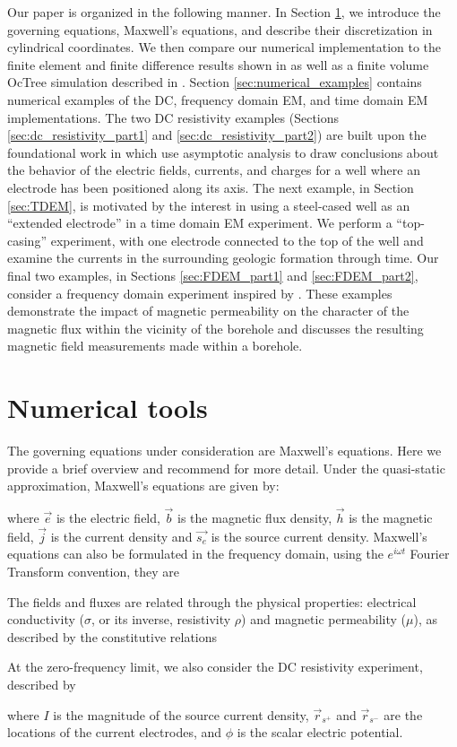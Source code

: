 \documentclass[preprint,review,3p,times,onecolumn,authoryear]{elsarticle}
\begin{document}
Our paper is organized in the following manner. In Section \ref{sec:numerical_tools}, we introduce the governing equations, Maxwell's equations, and describe their discretization in cylindrical coordinates. We then compare our numerical implementation to the finite element and finite difference results shown in \citep{Commer2015} as well as a finite volume OcTree simulation described in \citep{Haber2007}. Section \ref{sec:numerical_examples} contains numerical examples of the DC, frequency domain EM, and time domain EM implementations. The two DC resistivity examples (Sections \ref{sec:dc_resistivity_part1} and \ref{sec:dc_resistivity_part2}) are built upon the foundational work in \citep{Kaufman1990, Kaufman1993} which use asymptotic analysis to draw conclusions about the behavior of the electric fields, currents, and charges for a well where an electrode has been positioned along its axis. The next example, in Section \ref{sec:TDEM}, is motivated by the interest in using a steel-cased well as an ``extended electrode'' in a time domain EM experiment. We perform a ``top-casing'' experiment, with one electrode connected to the top of the well and examine the currents in the surrounding geologic formation through time. Our final two examples, in Sections \ref{sec:FDEM_part1} and \ref{sec:FDEM_part2}, consider a frequency domain experiment inspired by \citep{Augustin1989}. These examples demonstrate the impact of magnetic permeability on the character of the magnetic flux within the vicinity of the borehole and discusses the resulting magnetic field measurements made within a borehole.


\section{Numerical tools}
\label{sec:numerical_tools}


The governing equations under consideration are Maxwell's equations. Here we provide a brief overview and recommend \cite{Ward1988} for more detail. Under the quasi-static approximation, Maxwell's equations are given by:

where $\vec{e}$ is the electric field, $\vec{b}$ is the magnetic flux density, $\vec{h}$ is the magnetic field, $\vec{j}$ is the current density and $\vec{s_e}$ is the source current density. Maxwell's equations can also be formulated in the frequency domain, using the $e^{i \omega t}$ Fourier Transform convention, they are

The fields and fluxes are related through the physical properties: electrical conductivity ($\sigma$, or its inverse, resistivity $\rho$) and magnetic permeability ($\mu$), as described by the constitutive relations

At the zero-frequency limit, we also consider the DC resistivity experiment, described by

where $I$ is the magnitude of the source current density, $\vec{r}_{s^+}$ and $\vec{r}_{s^-}$ are the locations of the current electrodes, and $\phi$ is the scalar electric potential.
\end{document}
